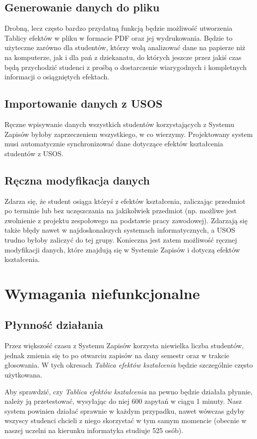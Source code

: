 \documentclass{article}
\begin{document}
\subsection{Generowanie danych do pliku}
Drobną, lecz często bardzo przydatną funkcją będzie możliwość utworzenia Tablicy efektów w pliku w formacie PDF oraz jej wydrukowania.
Będzie to użyteczne zarówno dla studentów, którzy wolą analizować dane na papierze niż na komputerze, jak i dla pań z dziekanatu, do których jeszcze przez jakiś czas będą przychodzić studenci z prośbą o dostarczenie wiarygodnych i kompletnych informacji o osiągniętych efektach.

\subsection{Importowanie danych z USOS} %
Ręczne wpisywanie danych wszystkich studentów korzystających z Systemu Zapisów byłoby zaprzeczeniem wszystkiego, w co wierzymy.
Projektowany system musi automatycznie synchronizować dane dotyczące efektów kształcenia studentów z USOS.

\subsection{Ręczna modyfikacja danych}
Zdarza się, że student osiąga któryś z efektów kształcenia, zaliczając przedmiot po terminie lub bez uczęszczania na jakikolwiek przedmiot (np. możliwe jest zwolnienie z projektu zespołowego na podstawie pracy zawodowej).
Zdarzają się także błędy nawet w najdoskonalszych systemach informatycznych, a USOS trudno byłoby zaliczyć do tej grupy.
Konieczna jest zatem możliwość ręcznej modyfikacji danych, które znajdują się w Systemie Zapisów i dotyczą efektów kształcenia.


\section{Wymagania niefunkcjonalne}

\subsection{Płynność działania}
Przez większość czasu z Systemu Zapisów korzysta niewielka liczba studentów, jednak zmienia się to po otwarciu zapisów na dany semestr oraz w trakcie głosowania.
W tych okresach \textit{Tablica efektów kształcenia} będzie szczególnie często użytkowana.

Aby sprawdzić, czy \textit{Tablica efektów kształcenia} na pewno będzie działała płynnie, należy ją przetestować, wysyłając do niej 600 zapytań w ciągu 1 minuty.
Nasz system powinien działać sprawnie w każdym przypadku, nawet wówczas gdyby wszyscy studenci chcieli z niego skorzystać w tym samym momencie (obecnie w naszej uczelni na kierunku informatyka studiuje 525 osób).
\end{document}
